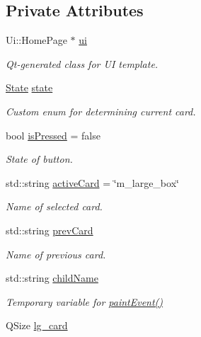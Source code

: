 \subsection*{Private Attributes}
\begin{DoxyCompactItemize}
\item 
Ui\+::\+Home\+Page $\ast$ \mbox{\hyperlink{classHomePage_ae5f1197f0c3aa11acf90d036ae4f91c7}{ui}}
\begin{DoxyCompactList}\small\item\em Qt-\/generated class for UI template. \end{DoxyCompactList}\item 
\mbox{\hyperlink{datatypes_8h_a5d74787dedbc4e11c1ab15bf487e61f8}{State}} \mbox{\hyperlink{classHomePage_a99cf5c5d03a03747ea209a27555f5687}{state}}
\begin{DoxyCompactList}\small\item\em Custom enum for determining current card. \end{DoxyCompactList}\item 
bool \mbox{\hyperlink{classHomePage_a30d025d463d4fac7cd65e375632c48d8}{is\+Pressed}} = false
\begin{DoxyCompactList}\small\item\em State of button. \end{DoxyCompactList}\item 
std\+::string \mbox{\hyperlink{classHomePage_aa62987c2e8b75ca00ae5967870670bd4}{active\+Card}} = \char`\"{}m\+\_\+large\+\_\+box\char`\"{}
\begin{DoxyCompactList}\small\item\em Name of selected card. \end{DoxyCompactList}\item 
std\+::string \mbox{\hyperlink{classHomePage_a1f64ec9c3e7b108095e87596675351d8}{prev\+Card}}
\begin{DoxyCompactList}\small\item\em Name of previous card. \end{DoxyCompactList}\item 
std\+::string \mbox{\hyperlink{classHomePage_a07abacb59d135ac5770492ac5ca0e0cf}{child\+Name}}
\begin{DoxyCompactList}\small\item\em Temporary variable for \mbox{\hyperlink{classHomePage_ab3daab17f753e46efcec8968333f88b5}{paint\+Event()}} \end{DoxyCompactList}\item 
Q\+Size \mbox{\hyperlink{classHomePage_a33542c9228f0a15c5a44eaeae67fb915}{lg\+\_\+card}}

\end{DoxyCompactItemize}
